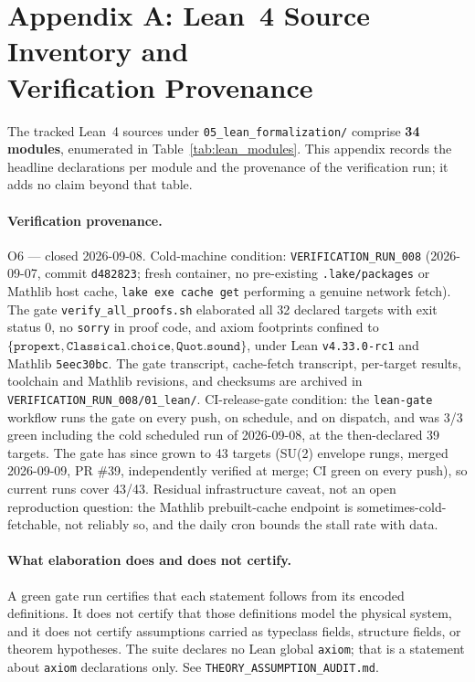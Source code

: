 \section*{Appendix A: Lean~4 Source Inventory and\\ Verification Provenance}
\label{app:lean_theorems}

The tracked Lean~4 sources under \texttt{05\_lean\_formalization/} comprise \textbf{34 modules},
enumerated in Table~\ref{tab:lean_modules}. This appendix records the headline declarations per
module and the provenance of the verification run; it adds no claim beyond that table.

\paragraph{Verification provenance.}
O6 --- closed 2026-09-08. Cold-machine condition: \texttt{VERIFICATION\_RUN\_008} (2026-09-07, commit \texttt{d482823}; fresh container, no pre-existing \texttt{.lake/packages} or Mathlib host cache, \texttt{lake exe cache get} performing a genuine network fetch). The gate \texttt{verify\_all\_proofs.sh} elaborated all 32 declared targets with exit status 0, no \texttt{sorry} in proof code, and axiom footprints confined to $\{\texttt{propext}, \texttt{Classical.choice}, \texttt{Quot.sound}\}$, under Lean \texttt{v4.33.0-rc1} and Mathlib \texttt{5eec30bc}. The gate transcript, cache-fetch transcript, per-target results, toolchain and Mathlib revisions, and checksums are archived in \texttt{VERIFICATION\_RUN\_008/01\_lean/}. CI-release-gate condition: the \texttt{lean-gate} workflow runs the gate on every push, on schedule, and on dispatch, and was 3/3 green including the cold scheduled run of 2026-09-08, at the then-declared 39 targets. The gate has since grown to 43 targets (SU(2) envelope rungs, merged 2026-09-09, PR \#39, independently verified at merge; CI green on every push), so current runs cover 43/43. Residual infrastructure caveat, not an open reproduction question: the Mathlib prebuilt-cache endpoint is sometimes-cold-fetchable, not reliably so, and the daily cron bounds the stall rate with data.

\paragraph{What elaboration does and does not certify.}
A green gate run certifies that each statement follows from its encoded definitions. It does not
certify that those definitions model the physical system, and it does not certify assumptions
carried as typeclass fields, structure fields, or theorem hypotheses. The suite declares no Lean
global \texttt{axiom}; that is a statement about \texttt{axiom} declarations only. See
\texttt{THEORY\_ASSUMPTION\_AUDIT.md}.

